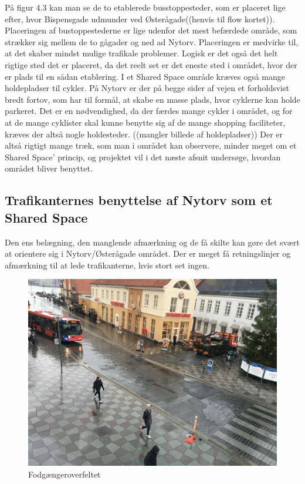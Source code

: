 På figur 4.3 kan man se de to etablerede busstoppesteder, som er placeret lige efter, hvor Bispensgade udmunder ved Østerågade((henvis til flow kortet)). Placeringen af bustoppestederne er lige udenfor det mest befærdede område, som strækker sig mellem de to gågader og ned ad Nytorv. Placeringen er medvirke til, at det skaber mindst mulige trafikale problemer. Logisk er det også det helt rigtige sted det er placeret, da det reelt set er det eneste sted i området, hvor der er plads til en sådan etablering. 
I et Shared Space område kræves også mange holdepladser til cykler. På Nytorv er der på begge sider af vejen et forholdsvist bredt fortov, som har til formål, at skabe en masse plads, hvor cyklerne kan holde parkeret. Det er en nødvendighed, da der færdes mange cykler i området, og for at de mange cyklister skal kunne benytte sig af de mange shopping faciliteter, kræves der altså nogle holdesteder. ((mangler billede af holdepladser))
Der er altså rigtigt mange træk, som man i området kan observere, minder meget om et Shared Space’ princip, og projektet vil i det næste afsnit undersøge, hvordan området bliver benyttet. 

\subsection{Trafikanternes benyttelse af Nytorv som et Shared Space}
\label{benyttelse_omrade}
Den ens belægning, den manglende afmærkning og de få skilte kan gøre det svært at orientere sig i Nytorv/Østerågade området. Der er meget få retningslinjer og afmærkning til at lede trafikanterne, hvis stort set ingen.

\begin{figure}[htbp]
   \label{fig:Fodfelt}
   \centering
   \begin{adjustbox}{max width=\textwidth}
     \includegraphics[scale=0.3]{billederogfigur/Fodfelt.jpg}
  \end{adjustbox}
   \caption{Fodgængeroverfeltet}
 \end{figure}


